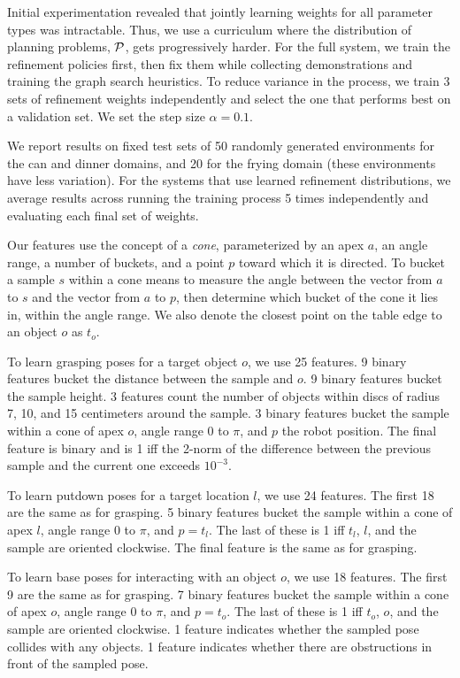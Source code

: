 Initial experimentation revealed that jointly learning weights for all
parameter types was intractable. Thus, we use a curriculum where the
distribution of planning problems, $\mathcal{P}$, gets progressively
harder. For the full system, we train the refinement policies first,
then fix them while collecting demonstrations and training the graph
search heuristics. To reduce variance in the process, we train 3 sets
of refinement weights independently and select the one that performs
best on a validation set. We set the step size $\alpha = 0.1$.

We report results on fixed test sets of 50 randomly generated
environments for the can and dinner domains, and 20 for the frying
domain (these environments have less variation).  For the
systems that use learned refinement distributions, we average results across running the
training process 5 times independently and evaluating each final set
of weights.

Our features use the concept of a \emph{cone}, parameterized by an apex $a$,
an angle range, a number of buckets, and a point $p$ toward which it is directed.
To bucket a sample $s$ within a cone means to measure the angle between the vector from
$a$ to $s$ and the vector from $a$ to $p$, then determine which bucket of the cone
it lies in, within the angle range. We also denote the closest point on the table edge to an object $o$ as $t_{o}$.

To learn grasping poses for a target object $o$, we use 25 features.
9 binary features bucket the distance between
the sample and $o$. 9 binary features bucket the
sample height. 3 features count the number of objects within
discs of radius 7, 10, and 15 centimeters around the sample. 3 binary
features bucket the sample within a cone of apex $o$, angle range 0 to $\pi$, and $p$
the robot position. The final feature is binary and is 1 iff the 2-norm of
the difference between the previous sample and the current one exceeds $10^{-3}$.

To learn putdown poses for a target location $l$, we use 24 features. The first
18 are the same as for grasping. 5 binary features bucket the sample within
a cone of apex $l$, angle range 0 to $\pi$, and $p = t_{l}$. The last of these is 1
iff $t_{l}$, $l$, and the sample are oriented clockwise. The final feature is the same as for grasping.

To learn base poses for interacting with an object $o$, we use 18 features. The first 9 are the same as
for grasping. 7 binary features bucket the sample within a cone of apex $o$, angle range 0 to $\pi$, and $p = t_{o}$.
The last of these is 1 iff $t_{o}$, $o$, and the sample are oriented clockwise.
1 feature indicates whether the sampled pose collides with any objects.
1 feature indicates whether there are obstructions in front of the sampled pose.

